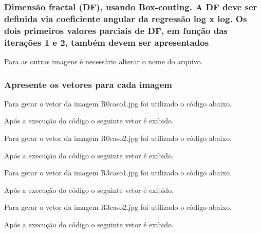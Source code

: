 \documentclass[10pt,a4paper]{article}
\begin{document}


\subsubsection{Dimensão fractal (DF), usando Box-couting. A DF deve ser definida via coeficiente angular da regressão log x log. Os dois primeiros valores parciais de DF, em função das iterações 1 e 2, também devem ser apresentados}



Para as outras imagens é necessário alterar o nome do arquivo.

\subsubsection{Apresente os vetores para cada imagem}

Para gerar o vetor da imagem R0\textunderscore caso1.jpg foi utilizado o código abaixo.



Após a execução do código o seguinte vetor é exibido.



Para gerar o vetor da imagem R0\textunderscore caso2.jpg foi utilizado o código abaixo.



Após a execução do código o seguinte vetor é exibido.



Para gerar o vetor da imagem R3\textunderscore caso1.jpg foi utilizado o código abaixo.



Após a execução do código o seguinte vetor é exibido.



Para gerar o vetor da imagem R3\textunderscore caso2.jpg foi utilizado o código abaixo.



Após a execução do código o seguinte vetor é exibido.
\end{document}
